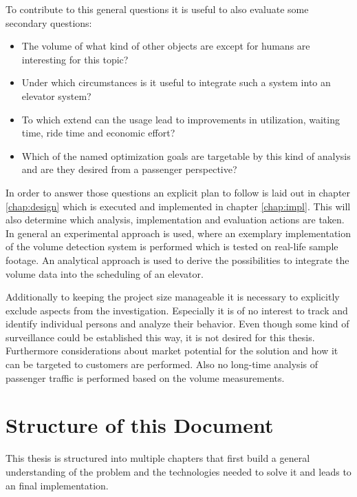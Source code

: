 To contribute to this general questions it is useful to also evaluate some secondary questions:

\begin{itemize}
    \item The volume of what kind of other objects are except for humans are interesting for this topic?
    \item Under which circumstances is it useful to integrate such a system into an elevator system?
    \item To which extend can the usage lead to improvements in utilization, waiting time, ride time and economic effort?
    \item Which of the named optimization goals are targetable by this kind of analysis and are they desired from a passenger perspective?
\end{itemize}

In order to answer those questions an explicit plan to follow is laid out in chapter \ref{chap:design} which is executed and implemented in chapter \ref{chap:impl}. 
This will also determine which analysis, implementation and evaluation actions are taken. 
In general an experimental approach is used, where an exemplary implementation of the volume detection system is performed which is tested on real-life sample footage. 
An analytical approach is used to derive the possibilities to integrate the volume data into the scheduling of an elevator.

Additionally to keeping the project size manageable it is necessary to explicitly exclude aspects from the  investigation. 
Especially it is of no interest to track and identify individual persons and analyze their behavior. 
Even though some kind of surveillance could be established this way, it is not desired for this thesis.
Furthermore considerations about market potential for the solution and how it can be targeted to customers are performed. 
Also no long-time analysis of passenger traffic is performed based on the volume measurements.

\section{Structure of this Document}

This thesis is structured into multiple chapters that first build a general understanding of the problem and the technologies needed to solve it and leads to an final implementation.

